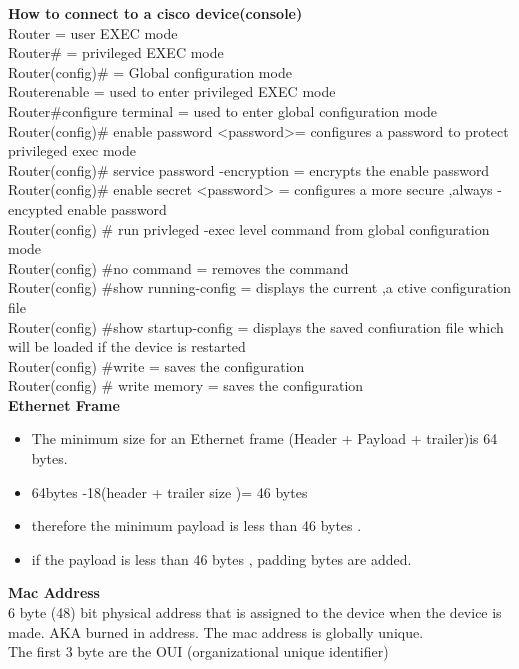 \documentclass{report}
\begin{document}
	\textbf{How to connect to a cisco device(console) }\\ Router\> = user EXEC
	mode \\ Router\# = privileged EXEC mode \\ Router(config)\# = Global configuration
	mode \\ Router\>enable = used to enter privileged EXEC mode \\ Router\#configure
	terminal = used to enter global configuration mode \\ Router(config)\# enable password
	<password>= configures a password to protect privileged exec mode\\ Router(config)\#
	service password -encryption = encrypts the enable password \\ Router(config)\#
	enable secret <password> = configures a more secure ,always -encypted enable
	password\\ Router(config) \# run privleged -exec level command from global configuration
	mode \\ Router(config) \#no command = removes the command\\ Router(config) \#show
	running-config = displays the current ,a ctive configuration file \\ Router(config)
	\#show startup-config = displays the saved confiuration file which will be loaded
	if the device is restarted \\ Router(config) \#write = saves the configuration
	\\ Router(config) \# write memory = saves the configuration \\ \textbf{Ethernet
	Frame}\\
	\begin{itemize}
		\item The minimum size for an Ethernet frame (Header + Payload + trailer)is
			64 bytes.

		\item 64bytes -18(header + trailer size )= 46 bytes

		\item therefore the minimum payload is less than 46 bytes .

		\item if the payload is less than 46 bytes , padding bytes are added.
	\end{itemize}
	\textbf{Mac Address}\\ 6 byte (48) bit physical address that is assigned to
	the device when the device is made. AKA burned in address. The mac address is
	globally unique.\\ The first 3 byte are the OUI (organizational unique identifier)
\end{document}
